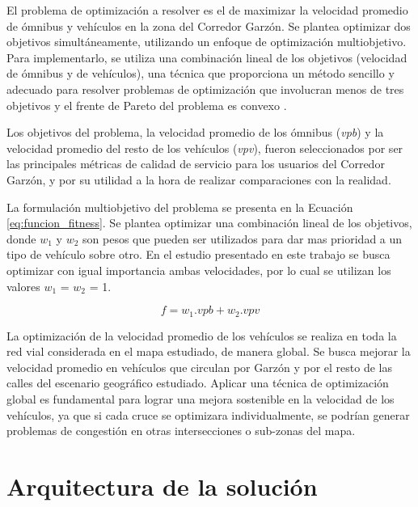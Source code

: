 El problema de optimización a resolver es el de maximizar la velocidad promedio de ómnibus y vehículos en la zona del Corredor Garzón. Se plantea optimizar dos objetivos simultáneamente, utilizando un enfoque de optimización multiobjetivo. Para implementarlo, se utiliza una combinación lineal de los objetivos (velocidad de ómnibus y de vehículos), una técnica que proporciona un método sencillo y adecuado para resolver problemas de optimización que involucran menos de tres objetivos y el frente de Pareto del problema es convexo \citep{coello2002evolutionary}.

Los objetivos del problema, la velocidad promedio de los ómnibus (\emph{vpb}) y la velocidad promedio del resto de los vehículos (\emph{vpv}), fueron seleccionados por ser las principales métricas de calidad de servicio para los usuarios del Corredor Garzón, y por su utilidad a la hora de realizar comparaciones con la realidad.

La formulación multiobjetivo del problema se presenta en la Ecuación \ref{eq:funcion_fitness}. Se plantea optimizar una combinación lineal de los objetivos, donde \emph{$w_1$} y \emph{$w_2$} son pesos que pueden ser utilizados para dar mas prioridad a un tipo de vehículo sobre otro. En el estudio presentado en este trabajo se busca optimizar con igual importancia ambas velocidades, por lo cual se utilizan los valores $w_1$ = $w_2$ = 1.

\begin{equation}
\label{eq:funcion_fitness}
f = w_1.vpb + w_2.vpv
\end{equation}

La optimización de la velocidad promedio de los vehículos se realiza en toda la red vial considerada en el mapa estudiado, de manera global. Se busca mejorar la velocidad promedio en vehículos que circulan por Garzón y por el resto de las calles del escenario geográfico estudiado. Aplicar una técnica de optimización global es fundamental para lograr una mejora sostenible en la velocidad de los vehículos, ya que si cada cruce se optimizara individualmente, se podrían generar problemas de congestión en otras intersecciones o sub-zonas del mapa.

\section{Arquitectura de la solución}



